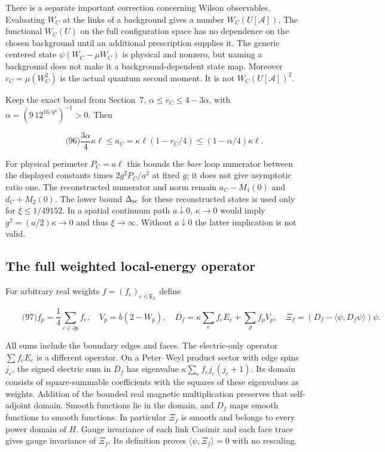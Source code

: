 There is a separate important correction concerning Wilson observables.
Evaluating \(W_C\) at the links of a background gives a number
\(W_C(U[\mathcal A])\). The functional \(W_C(U)\) on the full
configuration space has no dependence on the chosen background until an
additional prescription supplies it. The generic centered state
\(\psi(W_C-\mu W_C)\) is physical and nonzero, but naming a background
does not make it a background-dependent state map. Moreover
\(r_C=\mu(W_C^2)\) is the actual quantum second moment. It is not
\(W_C(U[\mathcal A])^2\).

Keep the exact bound from Section~7, \(\alpha\le r_C\le4-3\alpha\), with
\(\alpha=(9\,12^{16/g^4})^{-1}>0\). Then

\[
\qquad\text{(96)}
 \frac{3\alpha}{4}\kappa\ell\le
 a_C=\kappa\ell(1-r_C/4)
 \le(1-\alpha/4)\kappa\ell .
\]

For physical perimeter \(P_C=a\ell\) this bounds the \emph{bare} loop
numerator between the displayed constants times \(2g^2P_C/a^2\) at fixed
\(g\); it does not give asymptotic ratio one. The reconstructed
numerator and norm remain \(a_C-M_1(0)\) and \(d_C+M_2(0)\). The lower
bound \(\Delta_{\rm sc}\) for these reconstructed states is used only
for \(\xi\le1/49152\). In a spatial continuum path \(a\downarrow0\),
\(\kappa\to0\) would imply \(g^2=(a/2)\kappa\to0\) and thus
\(\xi\to\infty\). Without \(a\downarrow0\) the latter implication is not
valid.

\subsection{The full weighted local-energy
operator}\label{fabel-tensor-transfer-md-the-full-weighted-local-energy-operator}

For arbitrary real weights \(f=(f_e)_{e\in\mathsf E_L}\) define

\[
\qquad\text{(97)}
 f_p=\frac14\sum_{e\in\partial p}f_e,\quad
 V_p=b(2-W_p),\quad
 D_f=\kappa\sum_ef_eE_e+\sum_pf_pV_p,\quad
 \Xi_f=(D_f-\langle\psi,D_f\psi\rangle)\psi .
\]

All sums include the boundary edges and faces. The electric-only
operator \(\sum f_eE_e\) is a different operator. On a Peter--Weyl
product sector with edge spins \(j_e\), the signed electric sum in
\(D_f\) has eigenvalue \(\kappa\sum_ef_ej_e(j_e+1)\). Its domain
consists of square-summable coefficients with the squares of these
eigenvalues as weights. Addition of the bounded real magnetic
multiplication preserves that self-adjoint domain. Smooth functions lie
in the domain, and \(D_f\) maps smooth functions to smooth functions. In
particular \(\Xi_f\) is smooth and belongs to every power domain of
\(H\). Gauge invariance of each link Casimir and each face trace gives
gauge invariance of \(\Xi_f\). Its definition proves
\(\langle\psi,\Xi_f\rangle=0\) with no rescaling.

